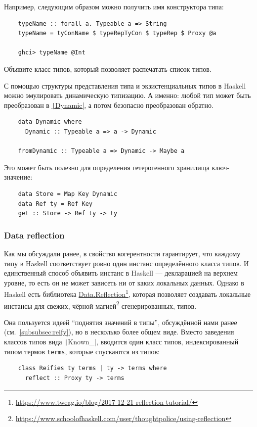 Например, следующим образом можно получить имя конструктора типа:
\begin{verbatim}
    typeName :: forall a. Typeable a => String
    typeName = tyConName $ typeRepTyCon $ typeRep $ Proxy @a

    ghci> typeName @Int
\end{verbatim}

\begin{task}
    Объявите класс типов, который позволяет распечатать список типов.
\end{task}

С помощью структуры представления типа и экзистенциальных типов в Haskell можно эмулировать динамическую типизацию.
А именно: любой тип может быть преобразован в \href{}{\texttt|Dynamic|}, а потом безопасно преобразован обратно.
\begin{verbatim}
    data Dynamic where
      Dynamic :: Typeable a => a -> Dynamic

    fromDynamic :: Typeable a => Dynamic -> Maybe a
\end{verbatim}

Это может быть полезно для определения гетерогенного хранилища ключ-значение:
\begin{verbatim}
    data Store = Map Key Dynamic
    data Ref ty = Ref Key
    get :: Store -> Ref ty -> ty
\end{verbatim}

\subsubsection{Data reflection}

Как мы обсуждали ранее, в свойство когерентности гарантирует, что каждому типу в Haskell соответствует ровно один инстанс определённого класса типов.
И единственный способ объявить инстанс в Haskell --- декларацией на верхнем уровне, то есть он не может зависеть ни от каких локальных данных.
Однако в Haskell есть библиотека \href{https://hackage.haskell.org/package/reflection-2.1.6/docs/Data-Reflection.html}{Data.Reflection}\footnote{\url{https://www.tweag.io/blog/2017-12-21-reflection-tutorial/}}, которая позволяет создавать локальные инстансы для свежих, чёрной магией\footnote{\url{https://www.schoolofhaskell.com/user/thoughtpolice/using-reflection}} сгенерированных, типов.

Она пользуется идеей ``поднятия значений в типы'', обсуждённой нами ранее (см.~\ref{subsubsec:reify}), но в несколько более общем виде.
Вместо заведения классов типов вида \texttt|Known_|, вводится один класс типов, индексированный типом термов \texttt{terms}, которые спускаются из типов:
\begin{verbatim}
    class Reifies ty terms | ty -> terms where
      reflect :: Proxy ty -> terms
\end{verbatim}


